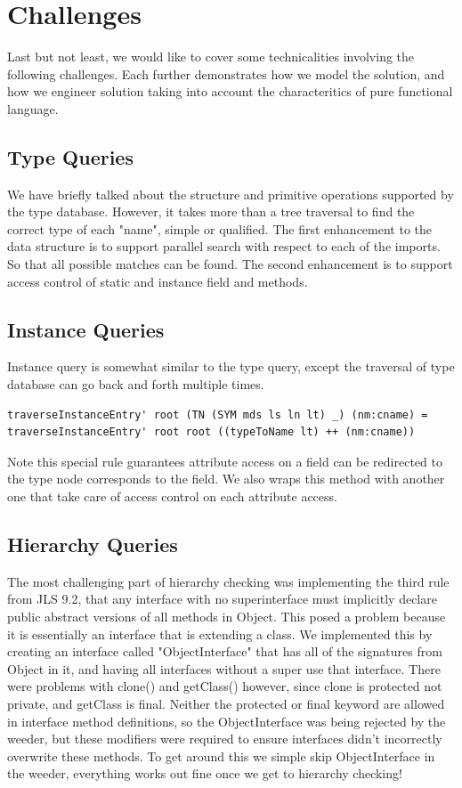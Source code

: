 \documentclass[12pt,letterpaper]{article}
\begin{document}
\section{Challenges}
Last but not least, we would like to cover some technicalities involving the following challenges. Each further demonstrates how we model the solution, and how we engineer solution taking into account the characteritics of pure functional language.

\subsection{Type  Queries}
We have briefly talked about the structure and primitive operations supported by the type database. However, it takes more than a tree traversal to find the correct type of each "name", simple or qualified. The first enhancement to the data structure is to support parallel search with respect to each of the imports. So that all possible matches can be found. The second enhancement is to support access control of static and instance field and methods.

\subsection{Instance Queries}
Instance query is somewhat similar to the type query, except the traversal of type database can go back and forth multiple times.
\begin{lstlisting}
traverseInstanceEntry' root (TN (SYM mds ls ln lt) _) (nm:cname) = traverseInstanceEntry' root root ((typeToName lt) ++ (nm:cname))
\end{lstlisting}

Note this special rule guarantees attribute access on a field can be redirected to the type node corresponds to the field. We also wraps this method with another one that take care of access control on each attribute access.

\subsection{Hierarchy Queries}
The most challenging part of hierarchy checking was implementing the third rule from JLS 9.2, that any interface with no superinterface must implicitly declare public abstract versions of all methods in Object.
This posed a problem because it is essentially an interface that is extending a class.
We implemented this by creating an interface called "ObjectInterface" that has all of the signatures from Object in it, and having all interfaces without a super use that interface.
There were problems with clone() and getClass() however, since clone is protected not private, and getClass is final.
Neither the protected or final keyword are allowed in interface method definitions, so the ObjectInterface was being rejected by the weeder, but these modifiers were required to ensure interfaces didn't incorrectly overwrite these methods.
To get around this we simple skip ObjectInterface in the weeder, everything works out fine once we get to hierarchy checking!
\end{document}
